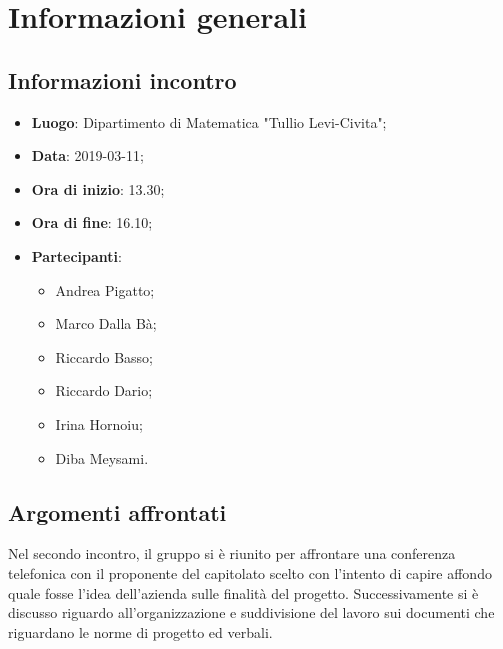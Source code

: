 \section{Informazioni generali}

\subsection{Informazioni incontro}
\begin{itemize}
	\item \textbf{Luogo}: Dipartimento di Matematica "Tullio Levi-Civita";
	\item \textbf{Data}: 2019-03-11;
	\item \textbf{Ora di inizio}: 13.30;
	\item \textbf{Ora di fine}: 16.10;
	\item \textbf{Partecipanti}: 
	\begin{itemize}
		\item Andrea Pigatto;
		\item Marco Dalla Bà;
		\item Riccardo Basso;
		\item Riccardo Dario;
		\item Irina Hornoiu;
		\item Diba Meysami.
	\end{itemize}
\end{itemize}

\subsection{Argomenti affrontati}
Nel secondo incontro, il gruppo si è riunito per affrontare una conferenza telefonica con il proponente del capitolato scelto
con l'intento di capire affondo quale fosse l'idea dell'azienda sulle finalità del progetto. 
Successivamente si è discusso riguardo all'organizzazione e suddivisione del lavoro sui documenti che riguardano le norme di progetto
ed verbali.
